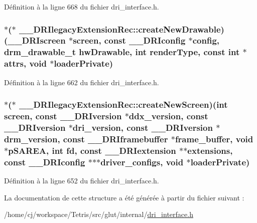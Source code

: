 Définition à la ligne 668 du fichier dri\-\_\-interface.\-h.

\hypertarget{struct_____d_r_ilegacy_extension_rec_a0d72393303d6f5af46b2ea23333d68e8}{
\subsubsection[{create\-New\-Drawable}]{$\ast$($\ast$ \-\_\-\-\_\-\-D\-R\-Ilegacy\-Extension\-Rec\-::create\-New\-Drawable)({\bf \-\_\-\-\_\-\-D\-R\-Iscreen} $\ast$screen, const {\bf \-\_\-\-\_\-\-D\-R\-Iconfig} $\ast$config, drm\-\_\-drawable\-\_\-t hw\-Drawable, int render\-Type, const int $\ast$attrs, {\bf void} $\ast$loader\-Private)}}\label{struct_____d_r_ilegacy_extension_rec_a0d72393303d6f5af46b2ea23333d68e8}


Définition à la ligne 662 du fichier dri\-\_\-interface.\-h.

\hypertarget{struct_____d_r_ilegacy_extension_rec_afe09eb004b0a0a6f3ce2aebcaff84f9a}{
\subsubsection[{create\-New\-Screen}]{$\ast$($\ast$ \-\_\-\-\_\-\-D\-R\-Ilegacy\-Extension\-Rec\-::create\-New\-Screen)(int screen, const {\bf \-\_\-\-\_\-\-D\-R\-Iversion} $\ast$ddx\-\_\-version, const {\bf \-\_\-\-\_\-\-D\-R\-Iversion} $\ast$dri\-\_\-version, const {\bf \-\_\-\-\_\-\-D\-R\-Iversion} $\ast$drm\-\_\-version, const {\bf \-\_\-\-\_\-\-D\-R\-Iframebuffer} $\ast$frame\-\_\-buffer, {\bf void} $\ast$p\-S\-A\-R\-E\-A, int fd, const {\bf \-\_\-\-\_\-\-D\-R\-Iextension} $\ast$$\ast$extensions, const {\bf \-\_\-\-\_\-\-D\-R\-Iconfig} $\ast$$\ast$$\ast$driver\-\_\-configs, {\bf void} $\ast$loader\-Private)}}\label{struct_____d_r_ilegacy_extension_rec_afe09eb004b0a0a6f3ce2aebcaff84f9a}


Définition à la ligne 652 du fichier dri\-\_\-interface.\-h.



La documentation de cette structure a été générée à partir du fichier suivant \-:\begin{DoxyCompactItemize}
\item 
/home/cj/workspace/\-Tetris/src/glut/internal/\hyperlink{dri__interface_8h}{dri\-\_\-interface.\-h}\end{DoxyCompactItemize}
